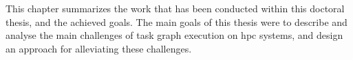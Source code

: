 This chapter summarizes the work that has been conducted within this doctoral thesis, and the
achieved goals. The main goals of this thesis were to describe and analyse the main challenges of
task graph execution on \gls{hpc} systems, and design an approach for alleviating these
challenges.

